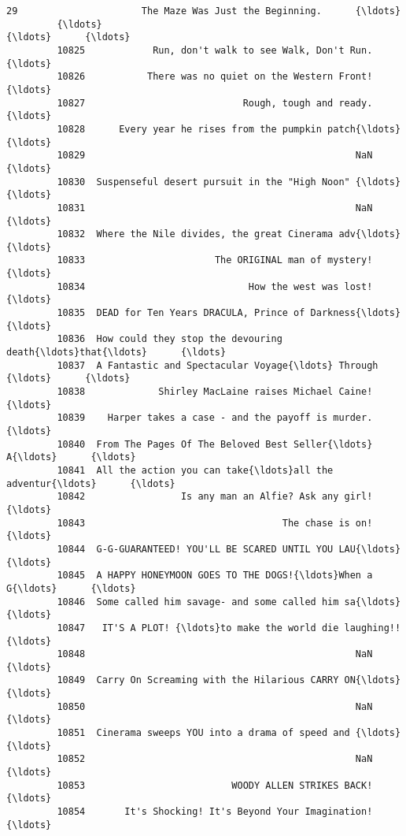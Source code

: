 \documentclass[11pt]{article}
\begin{document}
\begin{Verbatim}[commandchars=\\\{\}]
         29                      The Maze Was Just the Beginning.      {\ldots}        
         {\ldots}                                                  {\ldots}      {\ldots}        
         10825            Run, don't walk to see Walk, Don't Run.      {\ldots}        
         10826           There was no quiet on the Western Front!      {\ldots}        
         10827                            Rough, tough and ready.      {\ldots}        
         10828      Every year he rises from the pumpkin patch{\ldots}      {\ldots}        
         10829                                                NaN      {\ldots}        
         10830  Suspenseful desert pursuit in the "High Noon" {\ldots}      {\ldots}        
         10831                                                NaN      {\ldots}        
         10832  Where the Nile divides, the great Cinerama adv{\ldots}      {\ldots}        
         10833                       The ORIGINAL man of mystery!      {\ldots}        
         10834                             How the west was lost!      {\ldots}        
         10835  DEAD for Ten Years DRACULA, Prince of Darkness{\ldots}      {\ldots}        
         10836  How could they stop the devouring death{\ldots}that{\ldots}      {\ldots}        
         10837  A Fantastic and Spectacular Voyage{\ldots} Through {\ldots}      {\ldots}        
         10838             Shirley MacLaine raises Michael Caine!      {\ldots}        
         10839    Harper takes a case - and the payoff is murder.      {\ldots}        
         10840  From The Pages Of The Beloved Best Seller{\ldots} A{\ldots}      {\ldots}        
         10841  All the action you can take{\ldots}all the adventur{\ldots}      {\ldots}        
         10842                 Is any man an Alfie? Ask any girl!      {\ldots}        
         10843                                   The chase is on!      {\ldots}        
         10844  G-G-GUARANTEED! YOU'LL BE SCARED UNTIL YOU LAU{\ldots}      {\ldots}        
         10845  A HAPPY HONEYMOON GOES TO THE DOGS!{\ldots}When a G{\ldots}      {\ldots}        
         10846  Some called him savage- and some called him sa{\ldots}      {\ldots}        
         10847   IT'S A PLOT! {\ldots}to make the world die laughing!!      {\ldots}        
         10848                                                NaN      {\ldots}        
         10849  Carry On Screaming with the Hilarious CARRY ON{\ldots}      {\ldots}        
         10850                                                NaN      {\ldots}        
         10851  Cinerama sweeps YOU into a drama of speed and {\ldots}      {\ldots}        
         10852                                                NaN      {\ldots}        
         10853                          WOODY ALLEN STRIKES BACK!      {\ldots}        
         10854       It's Shocking! It's Beyond Your Imagination!      {\ldots}        
         

\end{Verbatim}
\end{document}

